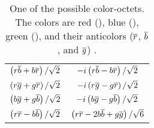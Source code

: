 \begin{table}[h]
    \centering
    \begin{center}
        \begin{tabular}{c  c}
            $\left( r \overline{b} + b \overline{r} \right) / \sqrt{2}$ &
            $-i \left( r \overline{b} - b \overline{r} \right) / \sqrt{2}$ \\
            $\left( r \overline{g} + g \overline{r} \right) / \sqrt{2}$ &
            $-i \left( r \overline{g} - g \overline{r} \right) / \sqrt{2}$ \\
            $\left( b \overline{g} + g \overline{b} \right) / \sqrt{2}$ &
            $-i \left( b \overline{g} - g \overline{b} \right) / \sqrt{2}$ \\
            $\left( r \overline{r} - b \overline{b} \right) / \sqrt{2}$ &
            $\left( r \overline{r} - 2b \overline{b} + g \overline{g} \right) / \sqrt{6}$ \\
        \end{tabular}
        \caption[
            One possible QCD color-octet.
        ]{
            One of the possible color-octets. The colors are red (\red), blue
            (\blue), green (\green), and their anticolors ($\overline{r}$,
            $\overline{b}$, and $\overline{g}$) .
        }
        \label{table:gluon_color}
    \end{center}
\end{table}
